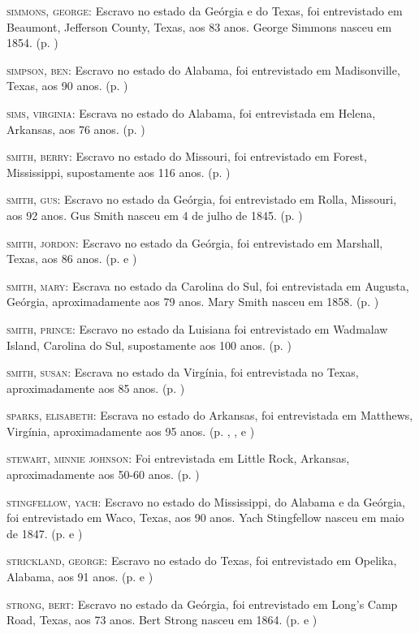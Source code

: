 \begin{Parskip}
\textsc{simmons, george:} Escravo no estado da Geórgia e do Texas, foi
entrevistado em Beaumont, Jefferson County, Texas, aos 83 anos. George
Simmons nasceu em 1854. (p. \pageref{ref239})

\textsc{simpson, ben:} Escravo no estado do Alabama, foi entrevistado em
Madisonville, Texas, aos 90 anos. (p. \pageref{ref240})

\textsc{sims, virginia:} Escrava no estado do Alabama, foi entrevistada
em Helena, Arkansas, aos 76 anos. (p. \pageref{ref241})

\textsc{smith, berry:} Escravo no estado do Missouri, foi entrevistado
em Forest, Mississippi, supostamente aos 116 anos. (p. \pageref{ref242})

\textsc{smith, gus:} Escravo no estado da Geórgia, foi entrevistado em
Rolla, Missouri, aos 92 anos. Gus Smith nasceu em 4 de julho de 1845. (p. \pageref{ref243})

\textsc{smith, jordon:} Escravo no estado da Geórgia, foi entrevistado
em Marshall, Texas, aos 86 anos. (p. \pageref{ref244} e \pageref{ref245})

\textsc{smith, mary:} Escrava no estado da Carolina do Sul, foi
entrevistada em Augusta, Geórgia, aproximadamente aos 79 anos. Mary
Smith nasceu em 1858. (p. \pageref{ref246})

\textsc{smith, prince:} Escravo no estado da Luisiana foi entrevistado
em Wadmalaw Island, Carolina do Sul, supostamente aos 100 anos. (p. \pageref{ref247})

\textsc{smith, susan:} Escrava no estado da Virgínia, foi entrevistada
no Texas, aproximadamente aos 85 anos. (p. \pageref{ref248})

\textsc{sparks, elisabeth:} Escrava no estado do Arkansas, foi
entrevistada em Matthews, Virgínia, aproximadamente aos 95 anos. (p. \pageref{ref249}, \pageref{ref250}, \pageref{ref251} e \pageref{ref252})

\textsc{stewart, minnie johnson:} Foi entrevistada em Little Rock,
Arkansas, aproximadamente aos 50-60 anos. (p. \pageref{ref253})

\textsc{stingfellow, yach:} Escravo no estado do Mississippi, do Alabama
e da Geórgia, foi entrevistado em Waco, Texas, aos 90 anos. Yach
Stingfellow nasceu em maio de 1847. (p. \pageref{ref254} e \pageref{ref255})

\textsc{strickland, george:} Escravo no estado do Texas, foi
entrevistado em Opelika, Alabama, aos 91 anos. (p. \pageref{ref256} e \pageref{ref257})

\textsc{strong, bert:} Escravo no estado da Geórgia, foi entrevistado em
Long's Camp Road, Texas, aos 73 anos. Bert Strong nasceu em 1864. (p. \pageref{ref258} e \pageref{ref259})


\end{Parskip}
